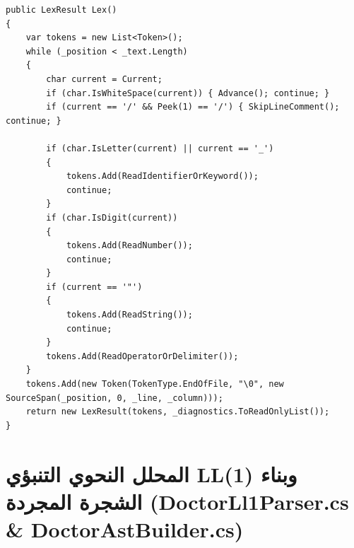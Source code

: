 \documentclass[12pt,a4paper]{report}
\begin{document}
\begin{lstlisting}[language={[Sharp]C}, caption={مقتطف حقيقي من المحلل المعجمي Lexer.cs}]
public LexResult Lex()
{
    var tokens = new List<Token>();
    while (_position < _text.Length)
    {
        char current = Current;
        if (char.IsWhiteSpace(current)) { Advance(); continue; }
        if (current == '/' && Peek(1) == '/') { SkipLineComment(); continue; }

        if (char.IsLetter(current) || current == '_')
        {
            tokens.Add(ReadIdentifierOrKeyword());
            continue;
        }
        if (char.IsDigit(current))
        {
            tokens.Add(ReadNumber());
            continue;
        }
        if (current == '"')
        {
            tokens.Add(ReadString());
            continue;
        }
        tokens.Add(ReadOperatorOrDelimiter());
    }
    tokens.Add(new Token(TokenType.EndOfFile, "\0", new SourceSpan(_position, 0, _line, _column)));
    return new LexResult(tokens, _diagnostics.ToReadOnlyList());
}
\end{lstlisting}

\newpage

\section{المحلل النحوي التنبؤي LL(1) وبناء الشجرة المجردة (DoctorLl1Parser.cs \& DoctorAstBuilder.cs)}
\end{document}
